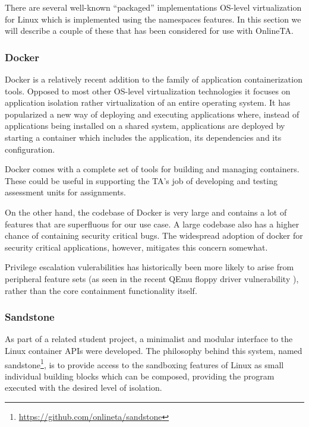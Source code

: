 There are several well-known "`packaged"' implementations OS-level
virtualization for Linux which is implemented using the namespaces
features. In this section we will describe a couple of these that has
been considered for use with OnlineTA.

\subsubsection{Docker}
Docker is a relatively recent addition to the family of application
containerization tools. Opposed to most other OS-level virtualization
technologies it focuses on application isolation rather
virtualization of an entire operating system. It has popularized a new
way of deploying and executing applications where, instead of
applications being installed on a shared system, applications are
deployed by starting a container which includes the application, its
dependencies and its configuration. \cite{whatisdocker}

Docker comes with a complete set of tools for building and managing
containers. These could be useful in supporting the TA's job of
developing and testing assessment units for assignments.

On the other hand, the codebase of Docker is very large and
contains a lot of features that are superfluous for our use
case. A large codebase also has a higher chance of containing security
critical bugs. The widespread adoption of docker for security critical
applications, however, mitigates this concern somewhat.

Privilege escalation vulerabilities has historically been more likely
to arise from peripheral feature sets (as seen in the recent QEmu
floppy driver vulnerability \cite{venom}), rather than the core containment
functionality itself.



\subsubsection{Sandstone}
As part of a related student project, a minimalist and modular
interface to the Linux container APIs were developed. The philosophy
behind this system, named
sandstone\footnote{\url{https://github.com/onlineta/sandstone}}, is to
provide access to the sandboxing features of Linux as small individual
building blocks which can be composed, providing the program executed
with the desired level of isolation.

